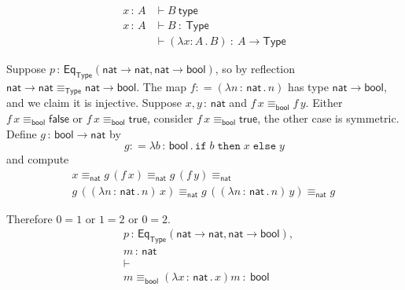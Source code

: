 \documentclass{article}
\newcommand{\defeq}{\mathrel{{:}{=}}}
\newcommand{\Type}{\mathsf{Type}}
\newcommand{\lam}[1]{\lambda #1 \,.\,}
\newcommand{\is}{\ :\ }
\newcommand{\isType}{\ \mathsf{type}}
\newcommand{\of}{\,{:}\,}
\newcommand{\Eq}[2]{\mathsf{Eq}_{#1}(#2)}
\newcommand{\bool}{\mathsf{bool}}
\newcommand{\true}{\mathsf{true}}
\newcommand{\false}{\mathsf{false}}
\newcommand{\nat}{\mathsf{nat}}
\begin{document}

\begin{align*}
  x \of A &\vdash B \isType \\
  x \of A &\vdash B \is \Type \\
          &\vdash (\lam{x : A} B) \is A \to \Type
\end{align*}


\newpage
\noindent
Suppose $p \of \Eq{\Type}{\nat \to \nat, \nat \to \bool}$, so by
reflection $\nat \to \nat \equiv_\Type \nat \to \bool$.
The map $f \defeq (\lam{n \of \nat} n)$ has type $\nat \to \bool$,
and we claim it is injective. Suppose $x, y \of \nat$ and $f\, x \equiv_\bool f \, y$.
Either $f \, x \equiv_\bool \false$ or $f \, x \equiv_\bool \true$, consider
$f \, x \equiv_\bool \true$, the other case is symmetric.
Define $g \of \bool \to \nat$ by
%
$$g \defeq \lam{b \of \bool}
  \mathtt{if}\; b \; \mathtt{then} \; x \; \mathtt{else} \; y$$
%
and compute
%
\begin{multline*}
  x \equiv_\nat
  g \, (f \, x) \equiv_\nat
  g \, (f \, y) \equiv_\nat \\
  g \, ((\lam{n \of \nat} n)\, x) \equiv_\nat
  g \, ((\lam{n \of \nat} n)\, y) \equiv_\nat
  g \, 
\end{multline*}




Therefore $0 = 1$ or $1 = 2$ or $0 = 2$.\\


\begin{align*}
  & p \of \Eq{\Type}{\nat \to \nat, \nat \to \bool},\\
  & m \of \nat \\
  &{\vdash} \\
  & m \equiv_\bool (\lam{x \of \nat} x) m \is \bool
\end{align*}

\end{document}
